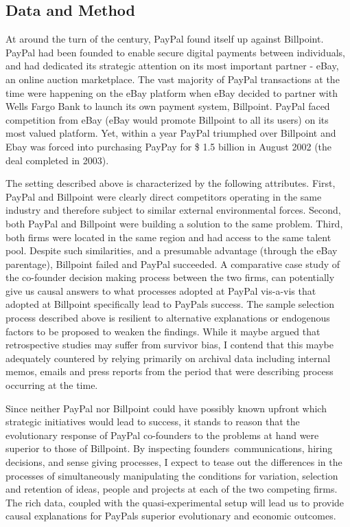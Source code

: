 \documentclass[12pt,letterpaper]{article}
\begin{document}
\subsection{Data and Method}
At around the turn of the century, PayPal found itself up against Billpoint. PayPal had been founded to enable secure digital payments between individuals, and had dedicated its strategic attention on its most important partner - eBay, an online auction marketplace. The vast majority of PayPal transactions at the time were happening on the eBay platform when eBay decided to partner with Wells Fargo Bank to launch its own payment system, Billpoint. PayPal faced competition from eBay (eBay would promote Billpoint to all its users) on its most valued platform. Yet, within a year PayPal triumphed over Billpoint and Ebay was forced into purchasing PayPay for \$ 1.5 billion in August 2002 (the deal completed in 2003).\par

The setting described above is characterized by the following attributes. First, PayPal and Billpoint were clearly direct competitors operating in the same industry and therefore subject to similar external environmental forces. Second, both PayPal and Billpoint were building a solution to the same problem. Third, both firms were located in the same region and had access to the same talent pool. Despite such similarities, and a presumable advantage (through the eBay parentage), Billpoint failed and PayPal succeeded. A comparative case study of the co-founder decision making process between the two firms, can potentially give us causal answers to what processes adopted at PayPal vis-a-vis that adopted at Billpoint specifically lead to PayPal\textquotesingle s success. The sample selection process described above is resilient to alternative explanations or endogenous factors to be proposed to weaken the findings. 
While it maybe argued that retrospective studies may suffer from survivor bias, I contend that this maybe adequately countered by relying primarily on archival data including internal memos, emails and press reports from the period that were describing process occurring at the time. 

Since neither PayPal nor Billpoint could have  possibly known upfront which strategic initiatives would lead to success, it stands to reason that the evolutionary response of PayPal co-founders to the problems at hand were superior to those of Billpoint. By inspecting founders\textquotesingle \ communications, hiring decisions, and sense giving processes, I expect to tease out the differences in the processes of simultaneously manipulating the conditions for variation, selection and retention of ideas, people and projects at each of the two competing firms. The rich data, coupled with the quasi-experimental setup will lead us to provide causal explanations for PayPal\textquotesingle s superior evolutionary and economic outcomes.
\end{document}
